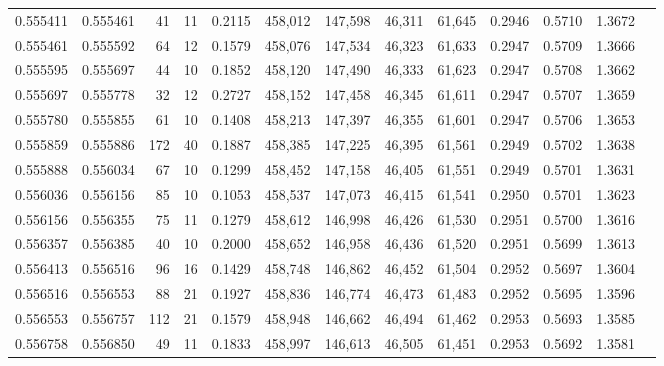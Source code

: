 \begin{tabular}{rrrrrrrrrrrrr}
0.555411 & 0.555461 &    41 &  11 &                                     0.2115 & 458,012 & 147,598 &  46,311 &  61,645 & 0.2946 & 0.5710 & 1.3672 \\
0.555461 & 0.555592 &    64 &  12 &                                     0.1579 & 458,076 & 147,534 &  46,323 &  61,633 & 0.2947 & 0.5709 & 1.3666 \\
0.555595 & 0.555697 &    44 &  10 &                                     0.1852 & 458,120 & 147,490 &  46,333 &  61,623 & 0.2947 & 0.5708 & 1.3662 \\
0.555697 & 0.555778 &    32 &  12 &                                     0.2727 & 458,152 & 147,458 &  46,345 &  61,611 & 0.2947 & 0.5707 & 1.3659 \\
0.555780 & 0.555855 &    61 &  10 &                                     0.1408 & 458,213 & 147,397 &  46,355 &  61,601 & 0.2947 & 0.5706 & 1.3653 \\
0.555859 & 0.555886 &   172 &  40 &                                     0.1887 & 458,385 & 147,225 &  46,395 &  61,561 & 0.2949 & 0.5702 & 1.3638 \\
0.555888 & 0.556034 &    67 &  10 &                                     0.1299 & 458,452 & 147,158 &  46,405 &  61,551 & 0.2949 & 0.5701 & 1.3631 \\
0.556036 & 0.556156 &    85 &  10 &                                     0.1053 & 458,537 & 147,073 &  46,415 &  61,541 & 0.2950 & 0.5701 & 1.3623 \\
0.556156 & 0.556355 &    75 &  11 &                                     0.1279 & 458,612 & 146,998 &  46,426 &  61,530 & 0.2951 & 0.5700 & 1.3616 \\
0.556357 & 0.556385 &    40 &  10 &                                     0.2000 & 458,652 & 146,958 &  46,436 &  61,520 & 0.2951 & 0.5699 & 1.3613 \\
0.556413 & 0.556516 &    96 &  16 &                                     0.1429 & 458,748 & 146,862 &  46,452 &  61,504 & 0.2952 & 0.5697 & 1.3604 \\
0.556516 & 0.556553 &    88 &  21 &                                     0.1927 & 458,836 & 146,774 &  46,473 &  61,483 & 0.2952 & 0.5695 & 1.3596 \\
0.556553 & 0.556757 &   112 &  21 &                                     0.1579 & 458,948 & 146,662 &  46,494 &  61,462 & 0.2953 & 0.5693 & 1.3585 \\
0.556758 & 0.556850 &    49 &  11 &                                     0.1833 & 458,997 & 146,613 &  46,505 &  61,451 & 0.2953 & 0.5692 & 1.3581 \\

\end{tabular}
